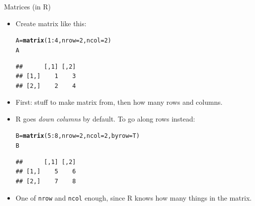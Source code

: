 \documentclass[unknownkeysallowed]{beamer}\usepackage[]{graphicx}\usepackage[]{color}
\makeatletter
\newcommand{\hlnum}[1]{\textcolor[rgb]{0.686,0.059,0.569}{#1}}%
\newcommand{\hlopt}[1]{\textcolor[rgb]{0,0,0}{#1}}%
\newcommand{\hlstd}[1]{\textcolor[rgb]{0.345,0.345,0.345}{#1}}%
\newcommand{\hlkwb}[1]{\textcolor[rgb]{0.69,0.353,0.396}{#1}}%
\newcommand{\hlkwc}[1]{\textcolor[rgb]{0.333,0.667,0.333}{#1}}%
\newcommand{\hlkwd}[1]{\textcolor[rgb]{0.737,0.353,0.396}{\textbf{#1}}}%
\newenvironment{kframe}{%
 \def\at@end@of@kframe{}%
 \ifinner\ifhmode%
  \def\at@end@of@kframe{\end{minipage}}%
  \begin{minipage}{\columnwidth}%
 \fi\fi%
 \def\FrameCommand##1{\hskip\@totalleftmargin \hskip-\fboxsep
 \colorbox{shadecolor}{##1}\hskip-\fboxsep
     \hskip-\linewidth \hskip-\@totalleftmargin \hskip\columnwidth}%
 \MakeFramed {\advance\hsize-\width
   \@totalleftmargin\z@ \linewidth\hsize
   \@setminipage}}%
 {\par\unskip\endMakeFramed%
 \at@end@of@kframe}
\newenvironment{knitrout}{}{} %
\makeatother
\begin{document}
\begin{frame}[fragile]{Matrices (in R)}

  \begin{itemize}
  \item Create matrix like this:
    
    \begin{footnotesize}
\begin{knitrout}
\color{fgcolor}\begin{kframe}
\begin{alltt}
\hlstd{A}\hlkwb{=}\hlkwd{matrix}\hlstd{(}\hlnum{1}\hlopt{:}\hlnum{4}\hlstd{,}\hlkwc{nrow}\hlstd{=}\hlnum{2}\hlstd{,}\hlkwc{ncol}\hlstd{=}\hlnum{2}\hlstd{)}
\hlstd{A}
\end{alltt}
\begin{verbatim}
##      [,1] [,2]
## [1,]    1    3
## [2,]    2    4
\end{verbatim}
\end{kframe}
\end{knitrout}
    \end{footnotesize}

\item First: stuff to make matrix from, then how many rows and columns.
\item R goes \emph{down columns} by default. To go along rows instead:
  
  \begin{footnotesize}
\begin{knitrout}
\color{fgcolor}\begin{kframe}
\begin{alltt}
\hlstd{B}\hlkwb{=}\hlkwd{matrix}\hlstd{(}\hlnum{5}\hlopt{:}\hlnum{8}\hlstd{,}\hlkwc{nrow}\hlstd{=}\hlnum{2}\hlstd{,}\hlkwc{ncol}\hlstd{=}\hlnum{2}\hlstd{,}\hlkwc{byrow}\hlstd{=T)}
\hlstd{B}
\end{alltt}
\begin{verbatim}
##      [,1] [,2]
## [1,]    5    6
## [2,]    7    8
\end{verbatim}
\end{kframe}
\end{knitrout}
    
  \end{footnotesize}
  
\item One of \texttt{nrow} and \texttt{ncol} enough, since R knows how
  many things in the matrix.
  \end{itemize}
  
\end{frame}
\end{document}
